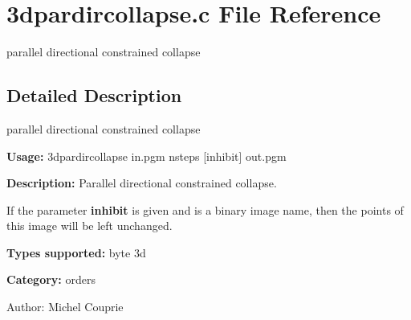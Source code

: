 \section{3dpardircollapse.c File Reference}
\label{3dpardircollapse_8c}
parallel directional constrained collapse 



\subsection{Detailed Description}
parallel directional constrained collapse 

{\bf Usage:} 3dpardircollapse in.pgm nsteps [inhibit] out.pgm

{\bf Description:} Parallel directional constrained collapse.

If the parameter {\bf inhibit} is given and is a binary image name, then the points of this image will be left unchanged.

{\bf Types supported:} byte 3d

{\bf Category:} orders

\begin{Desc}
\item[Author:]Michel Couprie \end{Desc}
